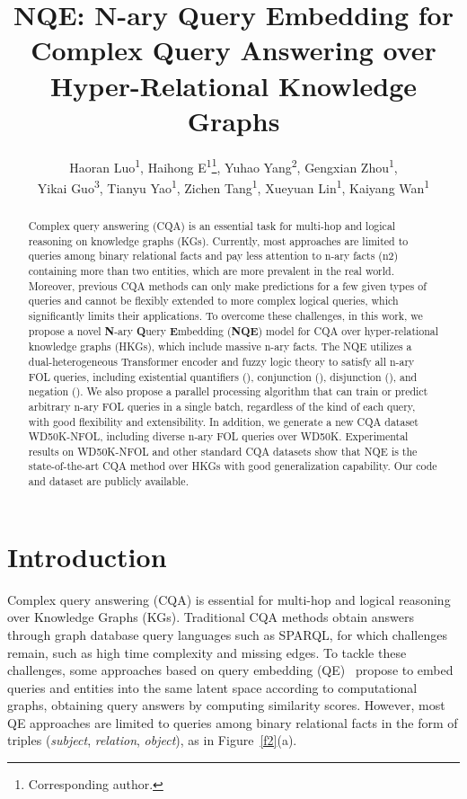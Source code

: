 \documentclass[letterpaper]{article} \usepackage{aaai23}  \usepackage{times}  \usepackage{helvet}  \usepackage{courier}  \usepackage[hyphens]{url}  \usepackage{graphicx} \urlstyle{rm} \def\UrlFont{\rm}  \usepackage{natbib}  \usepackage{caption} \frenchspacing  \setlength{\pdfpagewidth}{8.5in}  \setlength{\pdfpageheight}{11in}  \usepackage{algorithm}
\title{NQE: N-ary Query Embedding for Complex Query Answering over Hyper-Relational Knowledge Graphs}
\author{
Haoran Luo\textsuperscript{\rm 1},
    Haihong E\textsuperscript{\rm 1}\thanks{Corresponding author.},
    Yuhao Yang\textsuperscript{\rm 2},
    Gengxian Zhou\textsuperscript{\rm 1},\\
    Yikai Guo\textsuperscript{\rm 3},
    Tianyu Yao\textsuperscript{\rm 1},
    Zichen Tang\textsuperscript{\rm 1},
    Xueyuan Lin\textsuperscript{\rm 1},
    Kaiyang Wan\textsuperscript{\rm 1}
}
\begin{document}
\maketitle

\begin{abstract}
Complex query answering (CQA) is an essential task for multi-hop and logical reasoning on knowledge graphs (KGs). Currently, most approaches are limited to queries among binary relational facts and pay less attention to n-ary facts (n2) containing more than two entities, which are more prevalent in the real world. Moreover, previous CQA methods can only make predictions for a few given types of queries and cannot be flexibly extended to more complex logical queries, which significantly limits their applications. To overcome these challenges, in this work, we propose a novel \textbf{N}-ary \textbf{Q}uery \textbf{E}mbedding (\textbf{NQE}) model for CQA over hyper-relational knowledge graphs (HKGs), which include massive n-ary facts. The NQE utilizes a dual-heterogeneous Transformer encoder and fuzzy logic theory to satisfy all n-ary FOL queries, including existential quantifiers (), conjunction (), disjunction (), and negation (). We also propose a parallel processing algorithm that can train or predict arbitrary n-ary FOL queries in a single batch, regardless of the kind of each query, with good flexibility and extensibility. In addition, we generate a new CQA dataset WD50K-NFOL, including diverse n-ary FOL queries over WD50K. Experimental results on WD50K-NFOL and other standard CQA datasets show that NQE is the state-of-the-art CQA method over HKGs with good generalization capability. Our code and dataset are publicly available.
\end{abstract}


\section{Introduction}


Complex query answering (CQA) is essential for multi-hop and logical reasoning over Knowledge Graphs (KGs). Traditional CQA methods obtain answers through graph database query languages such as SPARQL, for which challenges remain, such as high time complexity and missing edges. To tackle these challenges, some approaches based on query embedding (QE)~\citep{GQE,Q2B,BetaE,CQD,ConE,FLEX,FuzzQE} propose to embed queries and entities into the same latent space according to computational graphs, obtaining query answers by computing similarity scores. However, most QE approaches are limited to queries among binary relational facts in the form of triples (\textit{subject}, \textit{relation}, \textit{object}), as in Figure~\ref{f2}(a).
\end{document}
